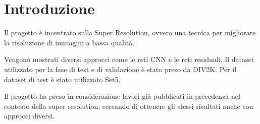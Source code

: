 \section{Introduzione}
Il progetto è incentrato sulla Super Resolution,
ovvero una tecnica per migliorare la risoluzione
di immagini a bassa qualità.

Vengono mostrati diversi approcci come le reti CNN e le reti residuali.
Il dataset utilizzato per la fase di test e di validazione è stato preso da DIV2K.
Per il dataset di test è stato utilizzato Set5.

Il progetto ha preso in considerazione lavori già pubblicati in precedenza nel
contesto della super resolution, cercando di ottenere
gli stessi risultati anche con approcci diversi.

